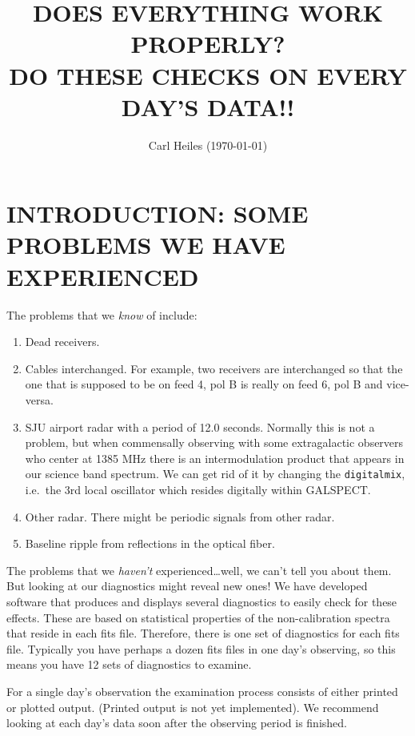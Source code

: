 \documentclass[psfig,preprint]{aastex}
\begin{document}
                                                                                
\title{DOES EVERYTHING WORK PROPERLY? \\
DO THESE CHECKS ON EVERY DAY'S DATA!!}

\author{Carl Heiles (\today)}

\tableofcontents

\clearpage

\section{INTRODUCTION: SOME PROBLEMS WE HAVE EXPERIENCED}

	The problems that we {\it know} of include:
\begin{enumerate}

	\item Dead receivers.

	\item Cables interchanged.  For example, two receivers are
interchanged so that the one that is supposed to be on feed 4, pol B is
really on feed 6, pol B and vice-versa. 

	\item SJU airport radar with a period of
12.0 seconds.  Normally this is not a problem, but when commensally
observing with some extragalactic observers who center at 1385 MHz there
is an intermodulation product that appears in our science band spectrum.
We can get rid of it by changing the \verb$digitalmix$, i.e.\ the 3rd
local oscillator which resides digitally within GALSPECT.

	\item Other radar. There might be periodic signals from other
radar.

	\item Baseline ripple from reflections in the optical fiber.
\end{enumerate}

	The problems that we {\it haven't} experienced\dots well, we
can't tell you about them.  But looking at our diagnostics might reveal
new ones! We have developed software that produces and displays several
diagnostics to easily check for these effects.  These are based on
statistical properties of the non-calibration spectra that reside in
each fits file.  Therefore, there is one set of diagnostics for each
fits file.  Typically you have perhaps a dozen fits files in one day's
observing, so this means you have 12 sets of diagnostics to examine. 

	For a single day's observation the examination process consists
of either printed or plotted output.  (Printed output is not yet
implemented).  We recommend looking at each day's data soon after the
observing period is finished. 
\end{document}
